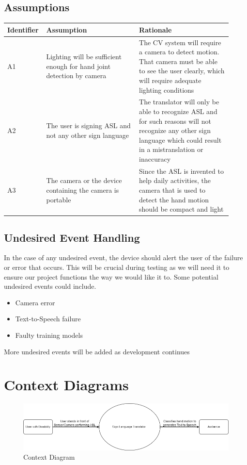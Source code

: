 \documentclass[12pt]{article}
\begin{document}
\subsection{Assumptions}

\renewcommand{\arraystretch}{1.2}
\noindent \begin{tabularx}{\textwidth}{p{0.12\linewidth}|p{0.4\linewidth}|p{0.4\linewidth}}
\toprule
\textbf{Identifier} & \textbf{Assumption} & \textbf{Rationale}\\
\midrule
A1 
& Lighting will be sufficient enough for hand joint detection by camera 
& The CV system will require a camera to detect motion. That camera must be able to see the user clearly, 
which will require adequate lighting conditions\\
\hline
A2
& The user is signing ASL and not any other sign language
& The translator will only be able to recognize ASL and for such reasons will not recognize any other sign language 
which could result in a mistranslation or inaccuracy\\
\hline
A3
& The camera or the device containing the camera is portable
& Since the ASL is invented to help daily activities, the camera that is used to detect the hand motion should be compact and light\\
\bottomrule
\end{tabularx}

\subsection{Undesired Event Handling}
In the case of any undesired event, the device should alert the user of the failure or error 
that occurs. This will be crucial during testing as we will need it to ensure our project functions
the way we would like it to. Some potential undesired events could include.
\begin{itemize}
    \item Camera error
    \item Text-to-Speech failure
    \item Faulty training models
\end{itemize}
More undesired events will be added as development continues


\section{Context Diagrams}

\begin{figure}[H] 
\centering
\includegraphics[width=\textwidth,height=0.88\textheight,keepaspectratio]{Context Diagram} 
\caption{Context Diagram} 
\label{Fig.Context_Diagram} 
\end{figure}
\end{document}
